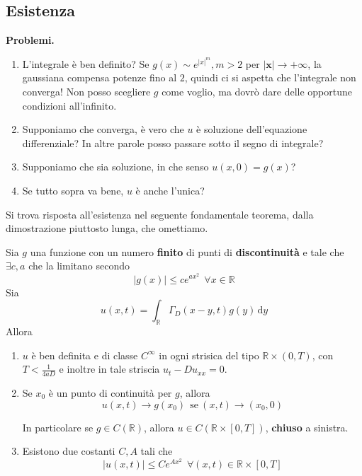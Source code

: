 \documentclass[10pt,a4paper,twoside,openright]{book}
\newcommand{\x}{\mathbf{x}}
\newcommand{\de}{\,\mathrm d}
\newcommand{\dy}{\de y}
\begin{document}
\subsection{Esistenza}

\textbf{Problemi.}
\begin{enumerate}
\item L'integrale è ben definito? Se $g(x) \sim e^{|x|^m},m >2$ per $|\x| \rightarrow +\infty $, la gaussiana compensa potenze fino al $2$, quindi ci si aspetta che l'integrale non converga! Non posso scegliere $g$ come voglio, ma dovrò dare delle opportune condizioni all'infinito.
\item Supponiamo che converga, è vero che $u$ è soluzione dell'equazione differenziale? In altre parole posso passare sotto il segno di integrale?
\item Supponiamo che sia soluzione, in che senso $u(x,0) =g(x)$?
\item Se tutto sopra va bene, $u$ è anche l'unica?
\end{enumerate}

Si trova risposta all'esistenza nel seguente fondamentale teorema, dalla dimostrazione piuttosto lunga, che omettiamo.
\begin{theorem}
[di Esistenza] Sia $g$ una funzione con un numero \textbf{finito} di punti di \textbf{discontinuità} e tale che $\exists c,a$ che la limitano secondo
\begin{equation}
\tag{G}
| g(x)| \leqslant ce^{ax^{2}} \ \ \forall x\in \mathbb{R}
\label{eq:pcg-diffusione-condizione-g}
\end{equation}
Sia
\begin{equation*}
u(x,t) =\int _{\mathbb{R}} \Gamma _{D}(x-y,t) g(y) \dy
\end{equation*}
Allora
\begin{enumerate}
\item $u$ è ben definita e di classe $C^{\infty }$ in ogni strisica del tipo $\mathbb{R} \times (0,T)$, con $T< \frac{1}{4aD}$ e inoltre in tale striscia $u_{t} -Du_{xx} =0$.
\item Se $x_{0}$ è un punto di continuità per $g$, allora
\begin{equation*}
u(x,t)\rightarrow g(x_{0}) \ \ \text{se} \ (x,t)\rightarrow (x_{0},0)
\end{equation*}

In particolare se $g\in C(\mathbb{R})$, allora $u\in C(\mathbb{R} \times [ 0,T])$, \textbf{chiuso} a sinistra.
\item Esistono due costanti $C,A$ tali che
\begin{equation*}
| u(x,t)| \leqslant Ce^{Ax^{2}} \ \ \forall (x,t) \in \mathbb{R} \times [ 0,T]
\end{equation*}
\end{enumerate}
\end{theorem}
\end{document}
